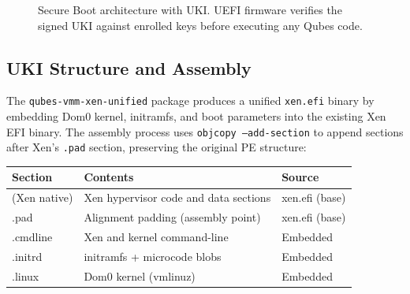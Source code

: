 \documentclass[12pt, a4paper]{article}
\begin{document}
\begin{figure}[H]
\caption{Secure Boot architecture with UKI. UEFI firmware verifies the signed UKI against enrolled keys before executing any Qubes code.}
\label{fig:secure-boot}
\end{figure}

\subsection{UKI Structure and Assembly}

The \texttt{qubes-vmm-xen-unified} package produces a unified \texttt{xen.efi} binary by embedding Dom0 kernel, initramfs, and boot parameters into the existing Xen EFI binary. The assembly process uses \texttt{objcopy --add-section} to append sections after Xen's \texttt{.pad} section, preserving the original PE structure:

\begin{table}[H]
\centering
\begin{tabular}{>{\ttfamily}p{2.5cm} p{7cm} p{3cm}}
\toprule
\normalfont\textbf{Section} & \textbf{Contents} & \textbf{Source} \\
\midrule
(Xen native)  & Xen hypervisor code and data sections & xen.efi (base) \\
.pad         & Alignment padding (assembly point) & xen.efi (base) \\
.cmdline     & Xen and kernel command-line & Embedded \\
.initrd      & initramfs + microcode blobs & Embedded \\
.linux       & Dom0 kernel (vmlinuz) & Embedded \\
\bottomrule
\end{tabular}
\end{table}
\end{document}

